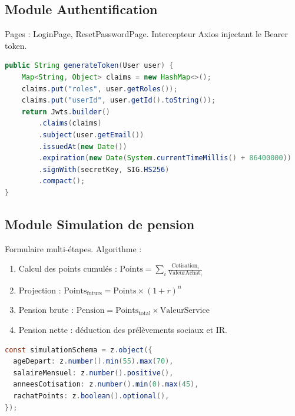 \documentclass[12pt,a4paper,oneside]{report}
\begin{document}
\subsection{Module Authentification}
Pages : LoginPage, ResetPasswordPage. Intercepteur Axios injectant le Bearer token.

\begin{lstlisting}[language=Java,caption={Generation du JWT}]
public String generateToken(User user) {
    Map<String, Object> claims = new HashMap<>();
    claims.put("roles", user.getRoles());
    claims.put("userId", user.getId().toString());
    return Jwts.builder()
        .claims(claims)
        .subject(user.getEmail())
        .issuedAt(new Date())
        .expiration(new Date(System.currentTimeMillis() + 86400000))
        .signWith(secretKey, SIG.HS256)
        .compact();
}
\end{lstlisting}

\subsection{Module Simulation de pension}
Formulaire multi-étapes. Algorithme :
\begin{enumerate}
    \item Calcul des points cumulés : $\text{Points} = \sum_i \frac{\text{Cotisation}_i}{\text{ValeurAchat}_i}$
    \item Projection : $\text{Points}_{\text{futurs}} = \text{Points} \times (1 + r)^n$
    \item Pension brute : $\text{Pension} = \text{Points}_{\text{total}} \times \text{ValeurService}$
    \item Pension nette : déduction des prélèvements sociaux et IR.
\end{enumerate}

\begin{lstlisting}[language=Java,caption={Validation Zod cote frontend}]
const simulationSchema = z.object({
  ageDepart: z.number().min(55).max(70),
  salaireMensuel: z.number().positive(),
  anneesCotisation: z.number().min(0).max(45),
  rachatPoints: z.boolean().optional(),
});
\end{lstlisting}
\end{document}
